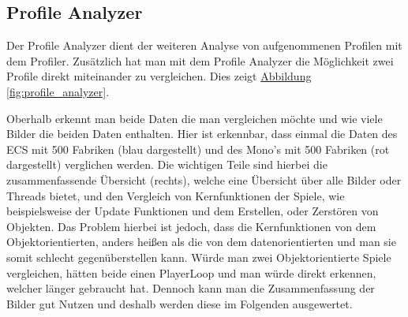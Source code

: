 \subsection{Profile Analyzer}
Der Profile Analyzer dient der weiteren Analyse von aufgenommenen Profilen mit dem Profiler. Zusätzlich hat man mit dem Profile Analyzer die Möglichkeit zwei Profile direkt miteinander zu vergleichen. Dies zeigt \hyperref[fig:profile_analyzer]{Abbildung \ref*{fig:profile_analyzer}}.

Oberhalb erkennt man beide Daten die man vergleichen möchte und wie viele Bilder die beiden Daten enthalten. Hier ist erkennbar, dass einmal die Daten des ECS mit 500 Fabriken (blau dargestellt) und des Mono's mit 500 Fabriken (rot dargestellt) verglichen werden. Die wichtigen Teile sind hierbei die zusammenfassende Übersicht (rechts), welche eine Übersicht über alle Bilder oder Threads bietet, und den Vergleich von Kernfunktionen der Spiele, wie beispielsweise der Update Funktionen und dem Erstellen, oder Zerstören von Objekten. Das Problem hierbei ist jedoch, dass die Kernfunktionen von dem Objektorientierten, anders heißen als die von dem datenorientierten und man sie somit schlecht gegenüberstellen kann. Würde man zwei Objektorientierte Spiele vergleichen, hätten beide einen PlayerLoop und man würde direkt erkennen, welcher länger gebraucht hat. Dennoch kann man die Zusammenfassung der Bilder gut Nutzen und deshalb werden diese im Folgenden ausgewertet.
